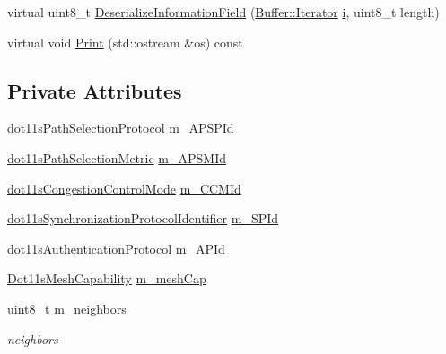 \begin{DoxyCompactItemize}
\item 
virtual uint8\+\_\+t \hyperlink{classns3_1_1dot11s_1_1IeConfiguration_a27f798747d2d223b87439104fc5d6855}{Deserialize\+Information\+Field} (\hyperlink{classns3_1_1Buffer_1_1Iterator}{Buffer\+::\+Iterator} \hyperlink{lte__uplink__power__control_8m_a6f6ccfcf58b31cb6412107d9d5281426}{i}, uint8\+\_\+t length)
\item 
virtual void \hyperlink{classns3_1_1dot11s_1_1IeConfiguration_a9f1204b5e2849039e3bc5f8b9e6a1246}{Print} (std\+::ostream \&os) const 
\end{DoxyCompactItemize}
\subsection*{Private Attributes}
\begin{DoxyCompactItemize}
\item 
\hyperlink{namespacens3_1_1dot11s_a0d1bf7753c746323a05091844fc055f9}{dot11s\+Path\+Selection\+Protocol} \hyperlink{classns3_1_1dot11s_1_1IeConfiguration_a95489a45a3fc74d3b8aeffc00fb984a5}{m\+\_\+\+A\+P\+S\+P\+Id}
\item 
\hyperlink{namespacens3_1_1dot11s_add870a70d1c8eef99d450ca9e0c51323}{dot11s\+Path\+Selection\+Metric} \hyperlink{classns3_1_1dot11s_1_1IeConfiguration_a66dad2c023fede11700bd82df7e84c63}{m\+\_\+\+A\+P\+S\+M\+Id}
\item 
\hyperlink{namespacens3_1_1dot11s_ad20738249c71cb28b1ef0acad0ceca0a}{dot11s\+Congestion\+Control\+Mode} \hyperlink{classns3_1_1dot11s_1_1IeConfiguration_a94af1b13a000077ca39a9d56c5475f67}{m\+\_\+\+C\+C\+M\+Id}
\item 
\hyperlink{namespacens3_1_1dot11s_a31fab993af76c062ff93945bdcb3f599}{dot11s\+Synchronization\+Protocol\+Identifier} \hyperlink{classns3_1_1dot11s_1_1IeConfiguration_acfce7f7c1ee695aa2678f6085d182304}{m\+\_\+\+S\+P\+Id}
\item 
\hyperlink{namespacens3_1_1dot11s_abdbcad7f88fa5bc91accac0865e18f25}{dot11s\+Authentication\+Protocol} \hyperlink{classns3_1_1dot11s_1_1IeConfiguration_a203084e324e20b8e82e4f9628f247e72}{m\+\_\+\+A\+P\+Id}
\item 
\hyperlink{classns3_1_1dot11s_1_1Dot11sMeshCapability}{Dot11s\+Mesh\+Capability} \hyperlink{classns3_1_1dot11s_1_1IeConfiguration_a1f225db31ce052cb7a9b880651a1f2ea}{m\+\_\+mesh\+Cap}
\item 
uint8\+\_\+t \hyperlink{classns3_1_1dot11s_1_1IeConfiguration_abc1ef247c86ee7edba5f08305aee8264}{m\+\_\+neighbors}
\begin{DoxyCompactList}\small\item\em neighbors \end{DoxyCompactList}\end{DoxyCompactItemize}
